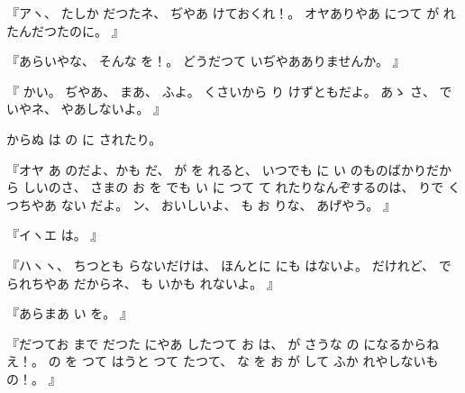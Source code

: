 %
『アヽ、
%
たしか
だつたネ、
%
ぢやあ
けておくれ！。
%
オヤありやあ
につて
が
れたんだつたのに。
』

%
『あらいやな、
%
そんな
を！。
%
どうだつて
いぢやあありませんか。
』

%
『
かい。
%
ぢやあ、
%
まあ、
%
ふよ。
%
くさいから
り
けずともだよ。
%
あゝ
さ、
%
で
いやネ、
%
やあしないよ。
』

%
からぬ
は
の
に
されたり。

%
『オヤ
あ
のだよ、かも
だ、
%
が
を
れると、
%
いつでも
に
い
のものばかりだから
しいのさ、
%
さまの
お
を
でも
い
に
つて
て
れたりなんぞするのは、
%
りで
くつちやあ
ない
だよ。
%
ン、
%
おいしいよ、
%
も
お
りな、
%
あげやう。
』

%
『イヽエ
は。
』

%
『ハヽヽ、
%
ちつとも
らないだけは、
%
ほんとに
にも
はないよ。
%
だけれど、
%
で
られちやあ
だからネ、
%
も
いかも
れないよ。
』

%
『あらまあ
い
を。
』

%
『だつてお
まで
だつた
にやあ
したつて
お
は、
%
が
さうな
の
になるからねえ！。
%
の
を
つて
はうと
つて
たつて、
%
な
を%
お
が
して
ふか
れやしないもの！。
』

